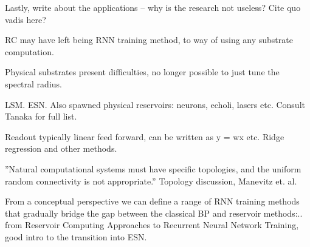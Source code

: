
Lastly, write about the applications -- why is the research not useless? Cite
quo vadis here?

RC may have left being RNN training method, to way of using any substrate
computation.

Physical substrates present difficulties, no longer possible to just tune the
spectral radius.

LSM. ESN. Also spawned physical reservoirs: neurons, echoli, lasers etc. Consult
Tanaka for full list.

Readout typically linear feed forward, can be written as y = wx etc. Ridge
regression and other methods.

''Natural computational systems must have specific topologies, and the uniform
random connectivity is not appropriate.'' Topology discussion, Manevitz et. al.

From a conceptual perspective we can define a range of RNN training methods that gradually bridge the
gap between the classical BP and reservoir methods:.. from Reservoir Computing Approaches to Recurrent Neural Network Training, good intro to the transition into ESN.

